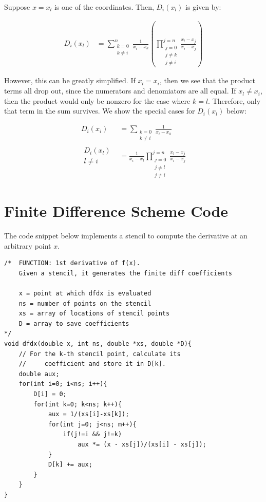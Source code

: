 \documentclass{article}
\begin{document}
Suppose $x = x_l$ is one of the coordinates.
Then, $D_i(x_l)$ is given by:

\begin{align}
D_i(x_l) & = 
	\sum_{\begin{matrix}k=0\\k\neq i\end{matrix}}^n
	\frac{1}{x_i - x_k}
	\left( \prod_{
		\begin{matrix} j = 0 \\ j \neq k\\j \neq i \end{matrix}}^{j=n}
		\frac{x_l - x_j}{x_i - x_j} \right)
\end{align}

However, this can be greatly simplified.
If $x_l = x_i$, then we see that the product terms all drop out,
	since the numerators and denomiators are all equal.
If $x_l \neq x_i$, then the product would only be nonzero for the
	case where $k=l$.
Therefore, only that term in the sum survives.
We show the special cases for $D_i(x_l)$ below:

\begin{align}
D_i(x_i) & = \sum_{\begin{matrix}k=0\\k\neq i\end{matrix}} \frac{1}{x_i - x_k}\\
\begin{matrix}D_i(x_l)\\l \neq i\end{matrix} & = \frac{1}{x_i - x_l} 
	\prod_{
		\begin{matrix} j = 0 \\ j \neq l\\j \neq i \end{matrix}}^{j=n}
		\frac{x_l - x_j}{x_i - x_j} 
\end{align}

\section{Finite Difference Scheme Code}

The code snippet below implements a stencil to compute the derivative
	at an arbitrary point $x$.

\lstset{language=C++}
\begin{lstlisting}
/*  FUNCTION: 1st derivative of f(x).
    Given a stencil, it generates the finite diff coefficients

    x = point at which dfdx is evaluated
    ns = number of points on the stencil
    xs = array of locations of stencil points
    D = array to save coefficients
*/
void dfdx(double x, int ns, double *xs, double *D){
    // For the k-th stencil point, calculate its 
    //     coefficient and store it in D[k].
    double aux;
    for(int i=0; i<ns; i++){
        D[i] = 0;
        for(int k=0; k<ns; k++){
            aux = 1/(xs[i]-xs[k]);
            for(int j=0; j<ns; m++){
                if(j!=i && j!=k)
                    aux *= (x - xs[j])/(xs[i] - xs[j]);
            }
            D[k] += aux;
        }
    }
}
\end{lstlisting}
\end{document}
